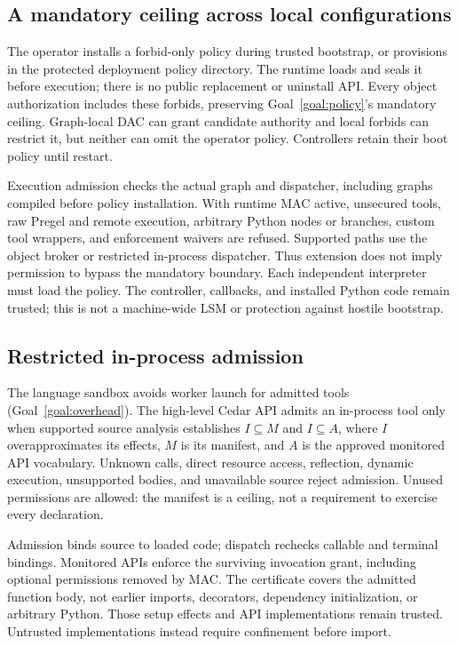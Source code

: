 \documentclass[letterpaper,twocolumn,10pt]{article}
\begin{document}
\subsection{A mandatory ceiling across local configurations}
\label{sec:runtime-mac}

The operator installs a forbid-only policy during trusted bootstrap, or provisions
 in the protected deployment policy directory. The runtime loads
and seals it before execution; there is no public replacement or uninstall API.
Every object authorization includes these forbids, preserving
Goal~\ref{goal:policy}'s mandatory ceiling. Graph-local DAC can grant
candidate authority and local forbids can restrict it, but neither can omit the
operator policy. Controllers retain their boot policy until restart.

Execution admission checks the actual graph and dispatcher, including graphs
compiled before policy installation. With runtime MAC active, unsecured tools,
raw Pregel and remote execution, arbitrary Python nodes or branches, custom tool
wrappers, and enforcement waivers are refused. Supported paths use the object
broker or restricted in-process dispatcher. Thus extension does not imply
permission to bypass the mandatory boundary. Each independent interpreter must
load the policy. The controller, callbacks, and installed Python code remain
trusted; this is not a machine-wide LSM or protection against hostile bootstrap.

\subsection{Restricted in-process admission}
\label{sec:language}

The language sandbox avoids worker launch for admitted tools
(Goal~\ref{goal:overhead}). The high-level Cedar API admits an in-process tool
only when supported source
analysis establishes $I\subseteq M$ and $I\subseteq A$, where $I$ overapproximates
its effects, $M$ is its manifest, and $A$ is the approved monitored API vocabulary.
Unknown calls, direct resource access, reflection, dynamic execution, unsupported
bodies, and unavailable source reject admission. Unused permissions are allowed:
the manifest is a ceiling, not a requirement to exercise every declaration.

Admission binds source to loaded code; dispatch rechecks callable and terminal
bindings. Monitored APIs enforce the surviving invocation grant, including
optional permissions removed by MAC. The certificate covers the admitted
function body, not earlier imports, decorators, dependency initialization, or
arbitrary Python. Those setup effects and API implementations remain trusted.
Untrusted implementations instead require confinement before import.
\end{document}

